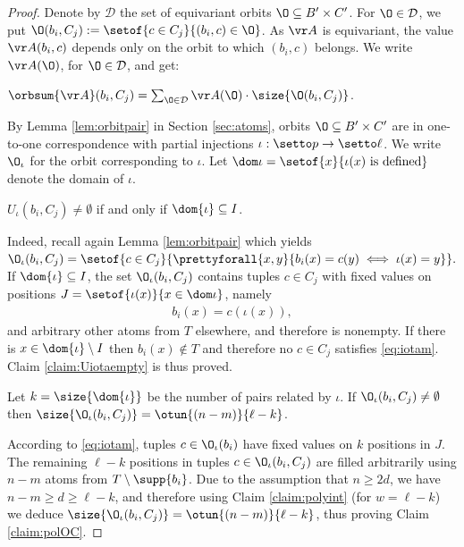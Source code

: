 \begin{proof}
Denote by $\mathcal D$ the set of equivariant orbits $\O \subseteq B' \times C'$.
For $\O\in \mathcal D$, we put $\O(b_i, C_j) := \setof{c\in C_j}{(b_i,c)\in \O}$.
%
%
As $\vr A$ is equivariant, the value $\vr A(b_i, c)$ depends only on the orbit to which $(b_i, c)$ belongs.
We write $\vr A(\O)$, for $\O\in\mathcal D$, and get:
%
\begin{claim} \label{claim:sum}
$\orbsum {\vr A}(b_i, C_j) = \sum_{\O\in \mathcal D} \vr A(\O) \cdot \size {\O(b_i, C_j)}$.
\end{claim}


By Lemma \ref{lem:orbitpair} in Section \ref{sec:atoms}, orbits $\O\subseteq B' \times C'$ are in 
one-to-one correspondence
with partial injections $\iota : \setto p \to \setto \ell$.
We write $\O_\iota$ for the orbit corresponding to $\iota$.
Let $\dom \iota = \setof{x}{\iota(x) \text{ is defined}}$ denote the domain of $\iota$.
%
\begin{claim} \label{claim:Uiotaempty}
$U_\iota(b_i, C_j)\neq \emptyset$ if and only if $\dom{\iota}\subseteq I$. 
\end{claim}
%
\noindent
Indeed, recall again Lemma \ref{lem:orbitpair}  which yields
$
\O_\iota(b_i, C_j) = \setof{ c \in C_j }{\prettyforall{x, y}{b_i(x) = c(y) \iff \iota(x) = y}}.
$
If $\dom{\iota}\subseteq I$, the set $\O_\iota(b_i, C_j)$ contains tuples $c\in C_j$ with fixed values
on positions $J = \setof{\iota(x)}{x\in\dom \iota}$, namely
\begin{align} \label{eq:iotam}
b_i(x) = c(\iota(x)),
\end{align}
and arbitrary other atoms from $T$ elsewhere, and therefore is nonempty.
If there is $x \in \dom{\iota}\setminus I$ then $b_i(x)\notin T$ and therefore
no $c\in C_j$ satisfies \eqref{eq:iotam}.
Claim \ref{claim:Uiotaempty} is thus proved.
%
\begin{claim} \label{claim:polOC}
Let $k = \size{\dom{\iota}}$ be
the number of pairs related by $\iota$.
If $\O_\iota(b_i, C_j)\neq \emptyset$ then $\size {\O_\iota(b_i, C_j)}  = \otun {(n-m)} {\ell - k}$. %
\end{claim}
%
\noindent
According to \eqref{eq:iotam}, tuples $c\in \O_\iota(b_i)$ have fixed values on $k$ positions in $J$.
The remaining $\ell - k$ positions in tuples $c\in \O_\iota(b_i,C_j)$ are filled arbitrarily
using $n-m$ atoms from $T\setminus \supp{b_i}$.
%
Due to the assumption that $n\geq 2d$, we have $n-m \geq d \geq  \ell - k$, and therefore
using Claim \ref{claim:polyint} (for $w=\ell-k$) we deduce 
$\size {\O_\iota(b_i,C_j)} = \otun {(n-m)} {\ell-k}$,  %
thus proving Claim \ref{claim:polOC}.


\end{proof}
